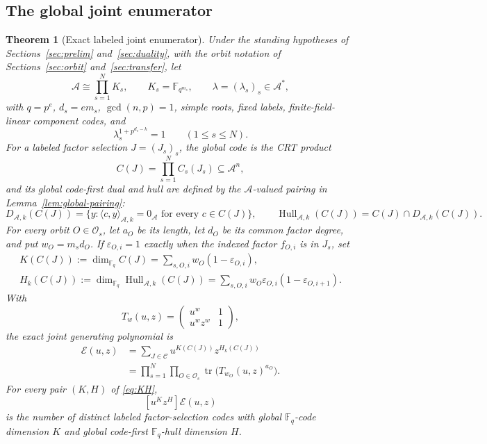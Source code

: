 \documentclass[11pt]{article}
\newcommand{\F}{\mathbb F}
\newcommand{\A}{\mathcal A}
\newcommand{\Os}{\mathcal O_s}
\newcommand{\Epoly}{\mathscr E}
\newcommand{\Hull}{\operatorname{Hull}}
\theoremstyle{plain}
\newtheorem{theorem}{Theorem}
\theoremstyle{definition}
\theoremstyle{remark}
\begin{document}
\subsection{The global joint enumerator}

\begin{theorem}[Exact labeled joint enumerator]\label{thm:central}
Under the standing hypotheses of Sections~\ref{sec:prelim} and~\ref{sec:duality}, with the orbit notation of Sections~\ref{sec:orbit} and~\ref{sec:transfer}, let
\[
\A\cong\prod_{s=1}^{N}K_s,
\qquad
K_s=\F_{q^{m_s}},
\qquad
\lambda=(\lambda_s)_s\in\A^*,
\]
with $q=p^e$, $d_s=e m_s$, $\gcd(n,p)=1$, simple roots, fixed labels, finite-field-linear component codes, and
\[
\lambda_s^{1+p^{d_s-k}}=1\qquad(1\leq s\leq N).
\]
For a labeled factor selection $J=(J_s)_s$, the global code is the CRT product
\[
C(J)=\prod_{s=1}^{N}C_s(J_s)\subseteq\A^n,
\]
and its global code-first dual and hull are defined by the $\A$-valued pairing in Lemma~\ref{lem:global-pairing}:
\[
D_{\A,k}(C(J))=\{y:\langle c,y\rangle_{\A,k}=0_{\A}\text{ for every }c\in C(J)\},
\qquad
\Hull_{\A,k}(C(J))=C(J)\cap D_{\A,k}(C(J)).
\]
For every orbit $O\in\Os$, let $a_O$ be its length, let $d_O$ be its common factor degree, and put $w_O=m_s d_O$. If
$\varepsilon_{O,i}=1$ exactly when the indexed factor $f_{O,i}$ is in $J_s$, set
\begin{equation}\label{eq:KH}
\begin{gathered}
K(C(J)):=\dim_{\F_q}C(J)
 =\sum_{s,O,i}w_O(1-\varepsilon_{O,i}),\\
H_k(C(J)):=\dim_{\F_q}\Hull_{\A,k}(C(J))
 =\sum_{s,O,i}w_O\varepsilon_{O,i}(1-\varepsilon_{O,i+1}).
\end{gathered}
\end{equation}
With
\[
T_w(u,z)=\begin{pmatrix}u^w&1\\u^wz^w&1\end{pmatrix},
\]
the exact joint generating polynomial is
\begin{equation}\label{eq:joint}
\begin{aligned}
\Epoly(u,z)
 &=\sum_{J\in\mathscr C}u^{K(C(J))}z^{H_k(C(J))}\\
 &=\prod_{s=1}^{N}\prod_{O\in\Os}
 \operatorname{tr}\bigl(T_{w_O}(u,z)^{a_O}\bigr).
\end{aligned}
\end{equation}
For every pair $(K,H)$ of \eqref{eq:KH},
\[
[u^Kz^H]\Epoly(u,z)
\]
is the number of distinct labeled factor-selection codes with global $\F_q$-code dimension $K$ and global code-first $\F_q$-hull dimension $H$.
\end{theorem}
\end{document}
